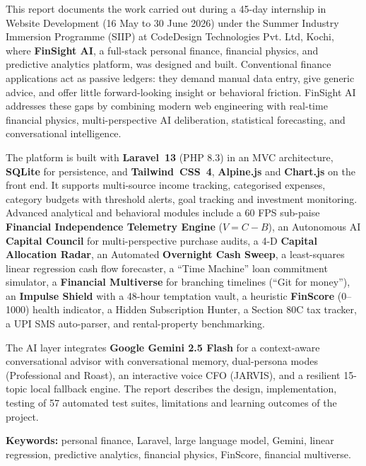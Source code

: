 \documentclass[12pt,a4paper]{report}
\newcommand{\LV}{Laravel~13}
\newcommand{\TW}{Tailwind~CSS~4}
\begin{document}
\noindent
This report documents the work carried out during a 45-day internship in Website Development (16 May to 30 June 2026) under the Summer Industry Immersion Programme (SIIP) at CodeDesign Technologies Pvt. Ltd, Kochi, where \textbf{FinSight AI}, a full-stack personal finance, financial physics, and predictive analytics platform, was designed and built. Conventional finance applications act as passive ledgers: they demand manual data entry, give generic advice, and offer little forward-looking insight or behavioral friction. FinSight AI addresses these gaps by combining modern web engineering with real-time financial physics, multi-perspective AI deliberation, statistical forecasting, and conversational intelligence.

\par\vspace{6pt}
\noindent
The platform is built with \textbf{\LV{}} (PHP 8.3) in an MVC architecture, \textbf{SQLite} for persistence, and \textbf{\TW{}}, \textbf{Alpine.js} and \textbf{Chart.js} on the front end. It supports multi-source income tracking, categorised expenses, category budgets with threshold alerts, goal tracking and investment monitoring. Advanced analytical and behavioral modules include a 60 FPS sub-paise \textbf{Financial Independence Telemetry Engine} ($V = C - B$), an Autonomous AI \textbf{Capital Council} for multi-perspective purchase audits, a 4-D \textbf{Capital Allocation Radar}, an Automated \textbf{Overnight Cash Sweep}, a least-squares linear regression cash flow forecaster, a ``Time Machine'' loan commitment simulator, a \textbf{Financial Multiverse} for branching timelines (``Git for money''), an \textbf{Impulse Shield} with a 48-hour temptation vault, a heuristic \textbf{FinScore} (0--1000) health indicator, a Hidden Subscription Hunter, a Section 80C tax tracker, a UPI SMS auto-parser, and rental-property benchmarking.

\par\vspace{6pt}
\noindent
The AI layer integrates \textbf{Google Gemini 2.5 Flash} for a context-aware conversational advisor with conversational memory, dual-persona modes (Professional and Roast), an interactive voice CFO (JARVIS), and a resilient 15-topic local fallback engine. The report describes the design, implementation, testing of 57 automated test suites, limitations and learning outcomes of the project.

\par\vspace{10pt}
\noindent
\textbf{Keywords:} personal finance, Laravel, large language model, Gemini, linear regression, predictive analytics, financial physics, FinScore, financial multiverse.
\end{document}
